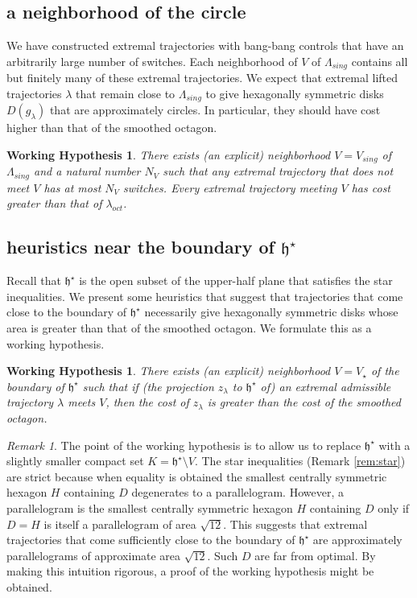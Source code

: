 \documentclass{article}
\newtheorem{working}[theorem]{Working Hypothesis}
\theoremstyle{remark}
\newtheorem{remark}[equation]{Remark}%
\def\hstar{{\mathfrak h}^\star}
\newcommand\Lsing{\Lambda_{sing}}
\begin{document}
\subsection{a neighborhood of the circle}

We have constructed extremal trajectories with bang-bang controls
that have an arbitrarily large
number of switches.  Each neighborhood of $V$ of $\Lsing$ contains
all but finitely many of these extremal trajectories.  We expect that 
extremal lifted trajectories $\lambda$
that remain close to $\Lsing$ to give hexagonally symmetric
disks $D(g_\lambda)$ that are approximately circles.  In particular,
they should have cost higher than that of the smoothed octagon.

\begin{working}  There exists (an explicit) neighborhood $V=V_{sing}$ of $\Lsing$ and
a natural number $N_V$ such that any extremal trajectory that
does not meet $V$ has at most $N_V$ switches.  Every extremal trajectory
meeting $V$ has cost greater than that of $\lambda_{oct}$.
\end{working}

\subsection{heuristics near the boundary of $\hstar$}

Recall that $\hstar$ is the open subset
of the upper-half plane that satisfies the star inequalities.
We present some heuristics that suggest that trajectories that come
close to the boundary of $\hstar$ necessarily give hexagonally symmetric disks
whose area is greater than that of the smoothed octagon.  We formulate
this as a working hypothesis.  

\begin{working}\label{hyp:star}   There exists (an explicit) neighborhood $V=V_\star$ of the
  boundary of $\hstar$ such that if (the projection $z_\lambda$ to
  $\hstar$ of) an extremal admissible trajectory $\lambda$ meets $V$,
  then the cost of $z_\lambda$ is greater than the cost of the
  smoothed octagon.
\end{working}

\begin{remark} The point of the working hypothesis is to allow us to
  replace $\hstar$ with a slightly smaller compact set
  $K=\hstar\setminus V$.  The star inequalities (Remark
  \ref{rem:star}) are strict because when equality is obtained the
  smallest centrally symmetric hexagon $H$ containing $D$ degenerates
  to a parallelogram.  However, a parallelogram is the smallest
  centrally symmetric hexagon $H$ containing $D$ only if $D=H$ is
  itself a parallelogram of area $\sqrt{12}$.  This suggests that
  extremal trajectories that come sufficiently close to the boundary
  of $\hstar$ are approximately parallelograms of approximate area
  $\sqrt{12}$.  Such $D$ are far from optimal.  By making this
  intuition rigorous, a proof of the working
  hypothesis might be obtained.
\end{remark}
\end{document}
